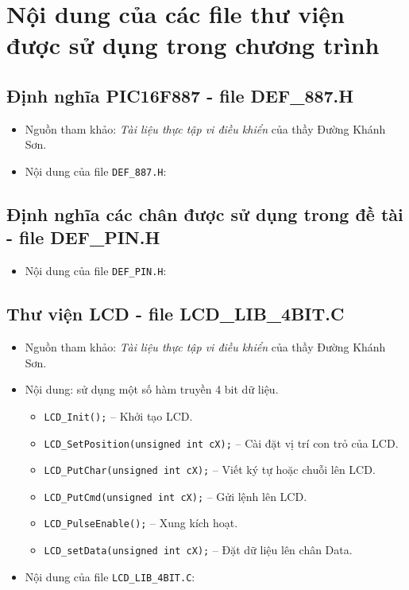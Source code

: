 \chapter{Nội dung của các file thư viện được sử dụng trong chương trình}\label{lib}
\section{Định nghĩa PIC16F887 - file DEF\_887.H} \label{def887}
\begin{itemize}
\item Nguồn tham khảo: \textit{Tài liệu thực tập vi điều khiển} của thầy Đường Khánh Sơn. 
\item Nội dung của file \verb|DEF_887.H|:

\end{itemize}
\section{Định nghĩa các chân được sử dụng trong đề tài - file DEF\_PIN.H} \label{defpin}
\begin{itemize}
\item Nội dung của file \verb|DEF_PIN.H|:

\end{itemize}
\section{Thư viện LCD - file LCD\_LIB\_4BIT.C} \label{libLCD}
\begin{itemize}
\item Nguồn tham khảo: \textit{Tài liệu thực tập vi điều khiển} của thầy Đường Khánh Sơn. 
\item Nội dung:  sử dụng một số hàm truyền 4 bit dữ liệu.
\begin{itemize}
\item \verb|LCD_Init();| -- Khởi tạo LCD.
\item \verb|LCD_SetPosition(unsigned int cX);| -- Cài đặt vị trí con trỏ của LCD.
\item \verb|LCD_PutChar(unsigned int cX);| -- Viết ký tự hoặc chuỗi lên LCD.
\item \verb|LCD_PutCmd(unsigned int cX);| -- Gửi lệnh lên LCD.
\item \verb|LCD_PulseEnable();| -- Xung kích hoạt.
\item \verb|LCD_setData(unsigned int cX);| -- Đặt dữ liệu lên chân Data.
\end{itemize}
\item Nội dung của file \verb|LCD_LIB_4BIT.C|:

\end{itemize}
